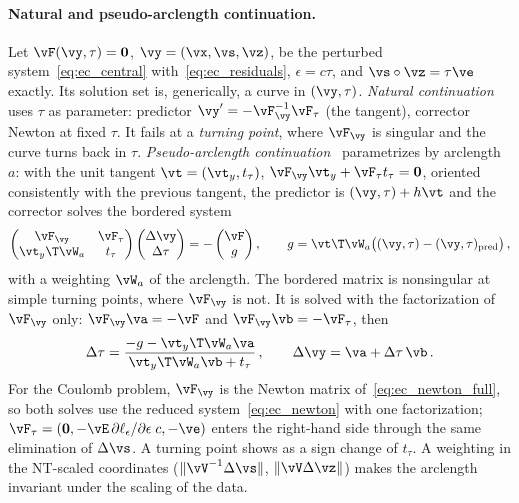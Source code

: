\paragraph{Natural and pseudo-arclength continuation.} Let $\vF(\vy, \tau) = \mathbf{0}$, $\vy = (\vx, \vs, \vz)$, be the perturbed system~\eqref{eq:ec_central} with~\eqref{eq:ec_residuals}, $\epsilon = c\tau$, and $\vs\circ\vz = \tau\ve$ exactly. Its solution set is, generically, a curve in $(\vy, \tau)$. \emph{Natural continuation} uses $\tau$ as parameter: predictor $\vy' = -\vF_{\vy}^{-1}\vF_{\tau}$ (the tangent), corrector Newton at fixed $\tau$. It fails at a \emph{turning point}, where $\vF_{\vy}$ is singular and the curve turns back in $\tau$. \emph{Pseudo-arclength continuation}~\cite{AllgowerGeorg2003} parametrizes by arclength $a$: with the unit tangent $\vt = (\vt_y, t_{\tau})$, $\vF_{\vy}\vt_y + \vF_{\tau} t_{\tau} = \mathbf{0}$, oriented consistently with the previous tangent, the predictor is $(\vy, \tau) + h\vt$ and the corrector solves the bordered system
%
\begin{equation}\label{eq:ec_bordered}
	\begin{pmatrix} \vF_{\vy} & \vF_{\tau} \\ \vt_y\T\vW_a & t_{\tau} \end{pmatrix}
	\begin{pmatrix} \Delta\vy \\ \Delta\tau \end{pmatrix}
	= -\begin{pmatrix} \vF \\ g \end{pmatrix} , \qquad
	g = \vt\T\vW_a\big((\vy, \tau) - (\vy, \tau)_{\mathrm{pred}}\big) \, ,
\end{equation}
%
with a weighting $\vW_a$ of the arclength. The bordered matrix is nonsingular at simple turning points, where $\vF_{\vy}$ is not. It is solved with the factorization of $\vF_{\vy}$ only: $\vF_{\vy}\va = -\vF$ and $\vF_{\vy}\vb = -\vF_{\tau}$, then
%
\begin{equation}
	\Delta\tau = \frac{-g - \vt_y\T\vW_a\va}{\vt_y\T\vW_a\vb + t_{\tau}} \, , \qquad \Delta\vy = \va + \Delta\tau\,\vb \, .
\end{equation}
%
For the Coulomb problem, $\vF_{\vy}$ is the Newton matrix of~\eqref{eq:ec_newton_full}, so both solves use the reduced system~\eqref{eq:ec_newton} with one factorization; $\vF_{\tau} = (\mathbf{0}, -\vE\,\partial\ell_\epsilon/\partial\epsilon\;c, -\ve)$ enters the right-hand side through the same elimination of $\Delta\vs$. A turning point shows as a sign change of $t_{\tau}$. A weighting in the NT-scaled coordinates ($\|\vV^{-1}\Delta\vs\|$, $\|\vV\Delta\vz\|$) makes the arclength invariant under the scaling of the data.
%
